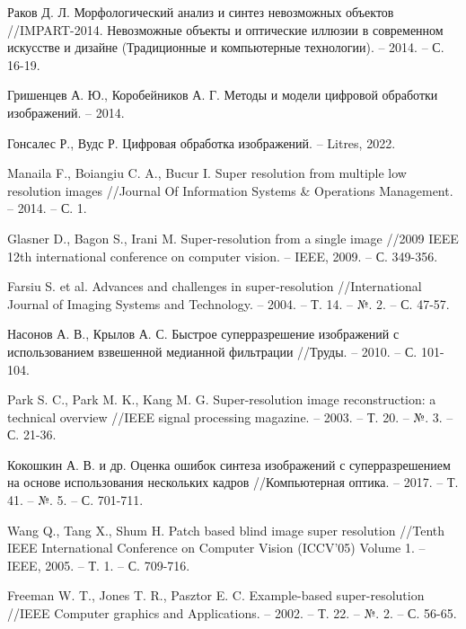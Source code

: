 \renewcommand\bibname{СПИСОК ИСПОЛЬЗОВАННЫХ ИСТОЧНИКОВ}
\begin{thebibliography}{3}
    \makeatletter
    \def\@biblabel#1{#1. }

    Раков Д. Л. Морфологический анализ и синтез невозможных объектов //IMPART-2014. Невозможные объекты и оптические иллюзии в современном искусстве и дизайне (Традиционные и компьютерные технологии). – 2014. – С. 16-19.
    
    Гришенцев А. Ю., Коробейников А. Г. Методы и модели цифровой обработки изображений. – 2014.

    Гонсалес Р., Вудс Р. Цифровая обработка изображений. – Litres, 2022.

    Manaila F., Boiangiu C. A., Bucur I. Super resolution from multiple low resolution images //Journal Of Information Systems & Operations Management. – 2014. – С. 1.

    Glasner D., Bagon S., Irani M. Super-resolution from a single image //2009 IEEE 12th international conference on computer vision. – IEEE, 2009. – С. 349-356.

    Farsiu S. et al. Advances and challenges in super‐resolution //International Journal of Imaging Systems and Technology. – 2004. – Т. 14. – №. 2. – С. 47-57.

    Насонов А. В., Крылов А. С. Быстрое суперразрешение изображений с использованием взвешенной медианной фильтрации //Труды. – 2010. – С. 101-104.

    Park S. C., Park M. K., Kang M. G. Super-resolution image reconstruction: a technical overview //IEEE signal processing magazine. – 2003. – Т. 20. – №. 3. – С. 21-36.

    Кокошкин А. В. и др. Оценка ошибок синтеза изображений с суперразрешением на основе использования нескольких кадров //Компьютерная оптика. – 2017. – Т. 41. – №. 5. – С. 701-711.

    Wang Q., Tang X., Shum H. Patch based blind image super resolution //Tenth IEEE International Conference on Computer Vision (ICCV'05) Volume 1. – IEEE, 2005. – Т. 1. – С. 709-716.

    Freeman W. T., Jones T. R., Pasztor E. C. Example-based super-resolution //IEEE Computer graphics and Applications. – 2002. – Т. 22. – №. 2. – С. 56-65.


\end{thebibliography}
